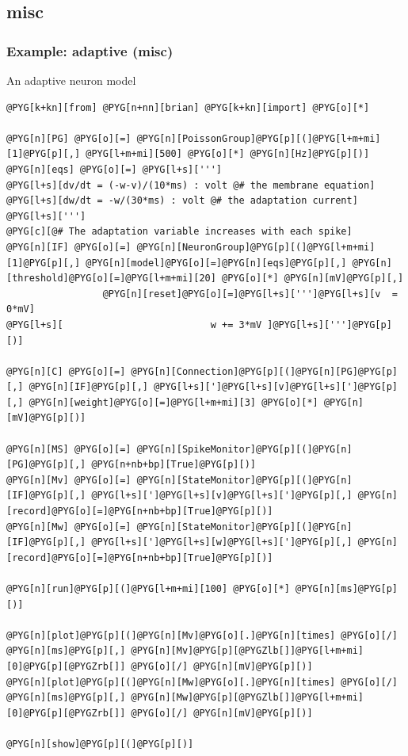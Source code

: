 \documentclass[letterpaper,10pt,english]{manual}
\begin{document}
\subsection{misc}

\resetcurrentobjects
\hypertarget{--doc-examples-misc_adaptive}{}

\hypertarget{index-41}{}\subsubsection{Example: adaptive (misc)}

An adaptive neuron model

\begin{Verbatim}[commandchars=@\[\]]
@PYG[k+kn][from] @PYG[n+nn][brian] @PYG[k+kn][import] @PYG[o][*]

@PYG[n][PG] @PYG[o][=] @PYG[n][PoissonGroup]@PYG[p][(]@PYG[l+m+mi][1]@PYG[p][,] @PYG[l+m+mi][500] @PYG[o][*] @PYG[n][Hz]@PYG[p][)]
@PYG[n][eqs] @PYG[o][=] @PYG[l+s][''']
@PYG[l+s][dv/dt = (-w-v)/(10*ms) : volt @# the membrane equation]
@PYG[l+s][dw/dt = -w/(30*ms) : volt @# the adaptation current]
@PYG[l+s][''']
@PYG[c][@# The adaptation variable increases with each spike]
@PYG[n][IF] @PYG[o][=] @PYG[n][NeuronGroup]@PYG[p][(]@PYG[l+m+mi][1]@PYG[p][,] @PYG[n][model]@PYG[o][=]@PYG[n][eqs]@PYG[p][,] @PYG[n][threshold]@PYG[o][=]@PYG[l+m+mi][20] @PYG[o][*] @PYG[n][mV]@PYG[p][,]
                 @PYG[n][reset]@PYG[o][=]@PYG[l+s][''']@PYG[l+s][v  = 0*mV]
@PYG[l+s][                          w += 3*mV ]@PYG[l+s][''']@PYG[p][)]

@PYG[n][C] @PYG[o][=] @PYG[n][Connection]@PYG[p][(]@PYG[n][PG]@PYG[p][,] @PYG[n][IF]@PYG[p][,] @PYG[l+s][']@PYG[l+s][v]@PYG[l+s][']@PYG[p][,] @PYG[n][weight]@PYG[o][=]@PYG[l+m+mi][3] @PYG[o][*] @PYG[n][mV]@PYG[p][)]

@PYG[n][MS] @PYG[o][=] @PYG[n][SpikeMonitor]@PYG[p][(]@PYG[n][PG]@PYG[p][,] @PYG[n+nb+bp][True]@PYG[p][)]
@PYG[n][Mv] @PYG[o][=] @PYG[n][StateMonitor]@PYG[p][(]@PYG[n][IF]@PYG[p][,] @PYG[l+s][']@PYG[l+s][v]@PYG[l+s][']@PYG[p][,] @PYG[n][record]@PYG[o][=]@PYG[n+nb+bp][True]@PYG[p][)]
@PYG[n][Mw] @PYG[o][=] @PYG[n][StateMonitor]@PYG[p][(]@PYG[n][IF]@PYG[p][,] @PYG[l+s][']@PYG[l+s][w]@PYG[l+s][']@PYG[p][,] @PYG[n][record]@PYG[o][=]@PYG[n+nb+bp][True]@PYG[p][)]

@PYG[n][run]@PYG[p][(]@PYG[l+m+mi][100] @PYG[o][*] @PYG[n][ms]@PYG[p][)]

@PYG[n][plot]@PYG[p][(]@PYG[n][Mv]@PYG[o][.]@PYG[n][times] @PYG[o][/] @PYG[n][ms]@PYG[p][,] @PYG[n][Mv]@PYG[p][@PYGZlb[]]@PYG[l+m+mi][0]@PYG[p][@PYGZrb[]] @PYG[o][/] @PYG[n][mV]@PYG[p][)]
@PYG[n][plot]@PYG[p][(]@PYG[n][Mw]@PYG[o][.]@PYG[n][times] @PYG[o][/] @PYG[n][ms]@PYG[p][,] @PYG[n][Mw]@PYG[p][@PYGZlb[]]@PYG[l+m+mi][0]@PYG[p][@PYGZrb[]] @PYG[o][/] @PYG[n][mV]@PYG[p][)]

@PYG[n][show]@PYG[p][(]@PYG[p][)]
\end{Verbatim}
\end{document}
